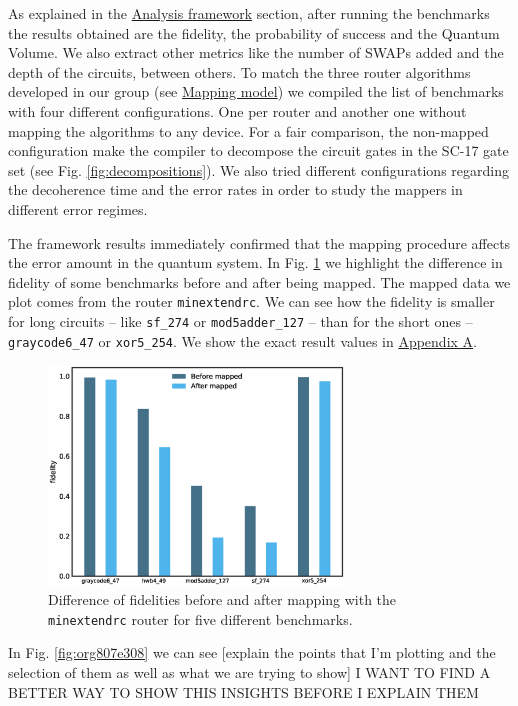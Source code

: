 \label{tab:map_selected_benchs}

As explained in the \href{chapter-4.org}{Analysis framework} section, after running the benchmarks the results obtained are the fidelity, the probability of success and the Quantum Volume.
We also extract other metrics like the number of SWAPs added and the depth of the circuits, between others.
To match the three router algorithms developed in our group (see \href{chapter-3.org}{Mapping model}) we compiled the list of benchmarks with four different configurations.
One per router and another one without mapping the algorithms to any device.
For a fair comparison, the non-mapped configuration make the compiler to decompose the circuit gates in the SC-17 gate set (see Fig. \ref{fig:decompositions}).
We also tried different configurations regarding the decoherence time and the error rates in order to study the mappers in different error regimes.


The framework results immediately confirmed that the mapping procedure affects the error amount in the quantum system.
In Fig. \ref{fig:org8847ed2} we highlight the difference in fidelity of some benchmarks before and after being mapped.
The mapped data we plot comes from the router \texttt{minextendrc}.
We can see how the fidelity is smaller for long circuits -- like \texttt{sf\_274} or \texttt{mod5adder\_127} -- than for the short ones -- \texttt{graycode6\_47} or \texttt{xor5\_254}.
We show the exact result values in \href{appendix-1.org}{Appendix A}.

\begin{figure}[htbp]
\centering
\includegraphics[width=0.7\textwidth]{figures/f_diff_bar_plot.eps}
\caption{\label{fig:org8847ed2}
Difference of fidelities before and after mapping with the \texttt{minextendrc} router for five different benchmarks.}
\end{figure}
In Fig. \ref{fig:org807e308} we can see [explain the points that I'm plotting and the selection of them as well as what we are trying to show]
I WANT TO FIND A BETTER WAY TO SHOW THIS INSIGHTS BEFORE I EXPLAIN THEM

